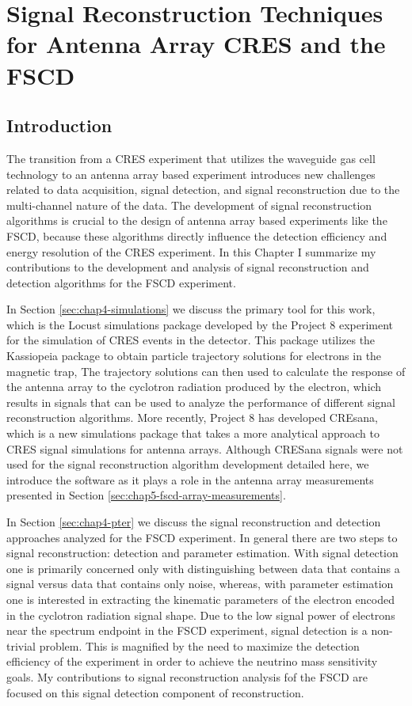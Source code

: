 \chapter{Signal Reconstruction Techniques for Antenna Array CRES and the FSCD}

\section{Introduction}

The transition from a CRES experiment that utilizes the waveguide gas cell technology to an antenna array based experiment introduces new challenges related to data acquisition, signal detection, and signal reconstruction due to the multi-channel nature of the data. The development of signal reconstruction algorithms is crucial to the design of antenna array based experiments like the FSCD, because these algorithms directly influence the detection efficiency and energy resolution of the CRES experiment. In this Chapter I summarize my contributions to the development and analysis of signal reconstruction and detection algorithms for the FSCD experiment.

In Section \ref{sec:chap4-simulations} we discuss the primary tool for this work, which is the Locust simulations package developed by the Project 8 experiment for the simulation of CRES events in the detector. This package utilizes the Kassiopeia package to obtain particle trajectory solutions for electrons in the magnetic trap, The trajectory solutions can then used to calculate the response of the antenna array to the cyclotron radiation produced by the electron, which results in signals that can be used to analyze the performance of different signal reconstruction algorithms. More recently, Project 8 has developed CREsana, which is a new simulations package that takes a more analytical approach to CRES signal simulations for antenna arrays. Although CRESana signals were not used for the signal reconstruction algorithm development detailed here, we introduce the software as it plays a role in the antenna array measurements presented in Section \ref{sec:chap5-fscd-array-measurements}.

In Section \ref{sec:chap4-pter} we discuss the signal reconstruction and detection approaches analyzed for the FSCD experiment. In general there are two steps to signal reconstruction: detection and parameter estimation. With signal detection one is primarily concerned only with distinguishing between data that contains a signal versus data that contains only noise, whereas, with parameter estimation one is interested in extracting the kinematic parameters of the electron encoded in the cyclotron radiation signal shape. Due to the low signal power of electrons near the spectrum endpoint in the FSCD experiment, signal detection is a non-trivial problem. This is magnified by the need to maximize the detection efficiency of the experiment in order to achieve the neutrino mass sensitivity goals. My contributions to signal reconstruction analysis fof the FSCD are focused on this signal detection component of reconstruction.

